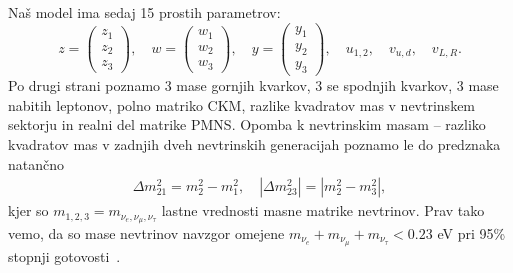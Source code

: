 Naš model ima sedaj 15 prostih parametrov:
\begin{equation}
	z = \begin{pmatrix}
		z_1 \\ z_2 \\ z_3
	\end{pmatrix}, \quad
	w = \begin{pmatrix}
		w_1 \\ w_2 \\ w_3
	\end{pmatrix}, \quad
	y = \begin{pmatrix}
		y_1 \\ y_2 \\ y_3
	\end{pmatrix}, \quad u_{1,2},\quad v_{u,d},\quad v_{L,R}.
\end{equation}
Po drugi strani poznamo 3 mase gornjih kvarkov, 3 se spodnjih kvarkov, 3 mase nabitih leptonov,
polno matriko CKM, razlike kvadratov mas v nevtrinskem sektorju in realni del matrike PMNS.
Opomba k nevtrinskim masam -- razliko kvadratov mas v zadnjih dveh nevtrinskih generacijah poznamo
le do predznaka natančno
\begin{align}
	\Delta m^2_{21} = m_2^2 - m_1^2, \quad |\Delta m_{23}^2| = |m_2^2 - m_3^2|,
\end{align}
kjer so $m_{1,2,3} = m_{\nu_e,\nu_\mu,\nu_\tau}$ lastne vrednosti masne matrike nevtrinov.
Prav tako vemo, da so mase nevtrinov navzgor omejene
$m_{\nu_e} + m_{\nu_\mu} + m_{\nu_\tau} < 0.23$ eV pri 95\% stopnji gotovosti~\cite{pdg:neutrinos}.

